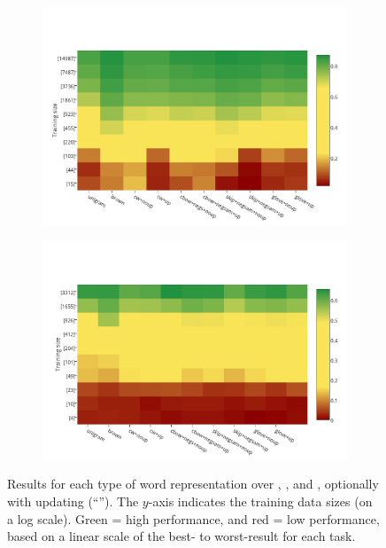 \begin{figure}[t!]
\begin{subfigure}{7cm}
    \includegraphics[scale=0.39]{plots/map-ner-color-invert}    	
	\subcaption{\ner (\fscore)}	
	\label{ner}
\end{subfigure}
\begin{subfigure}{7cm}
	\centering
    \includegraphics[scale=0.39]{plots/map-mwe-color-invert}
	\subcaption{\mwe (\fscore)}		
	\label{mwe}
\end{subfigure}
\caption{Results for each type of word representation over \pos, \chunking, \ner and
  \mwe, optionally with updating (``\withup''). The $y$-axis indicates the training data
  sizes (on a log scale). Green = high performance, and red = low
  performance, based on a linear scale of the best- to worst-result for
  each task. }
\label{fig:heatmaps}
\end{figure}

